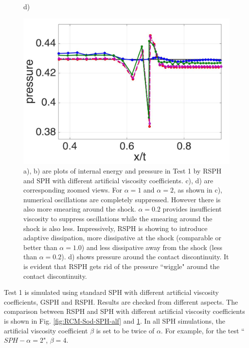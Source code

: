 \begin{figure}[H]
\begin{minipage}{.45 \textwidth}
    \end{minipage}%
    \begin{minipage}{.545\textwidth}
    \centering d)
        \begin{flushleft}
        \includegraphics[width= 0.8174 \textwidth, height=0.5780 \textwidth]{./Figures/RCM-Sod-SPH-alf-p-zoom}    
        \end{flushleft}
    \end{minipage}%
    \caption{
    a), b) are plots of internal energy and pressure in Test 1 by RSPH and SPH with different artificial viscosity coefficients.  c), d) are corresponding zoomed views. For $\alpha=1$ and $\alpha=2$, as shown in c), numerical oscillations are completely suppressed. However there is also more smearing around the shock. $\alpha=0.2$ provides insufficient viscosity to suppress oscillations while the smearing around the shock is also less. Impressively, RSPH is showing to introduce adaptive dissipation, more dissipative at the shock (comparable or better than $\alpha=1.0$) and less dissipative away from the shock (less than $\alpha=0.2$). d) shows pressure around the contact discontinuity. It is evident that RSPH gets rid of the pressure ``wiggle" around the contact discontinuity.}
    \label{fig:RCM-Sod-SPH-alf-zoom}
\end{figure}

Test 1 is simulated using standard SPH with different artificial viscosity coefficients, GSPH and RSPH. Results are checked from different aspects.  
The comparison between RSPH and SPH with different artificial viscosity coefficients is shown in Fig. \ref{fig:RCM-Sod-SPH-alf} and \ref{fig:RCM-Sod-SPH-alf-zoom}. In all SPH simulations, the artificial viscosity coefficient $\beta$ is set to be twice of $\alpha$. For example, for the test ``$SPH-\alpha=2$", $\beta=4$.

